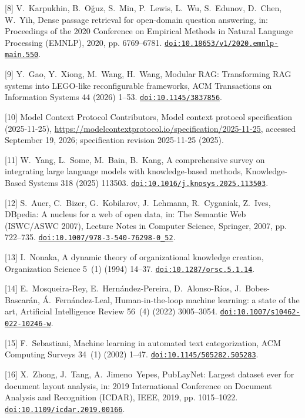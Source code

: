 [8] V.~Karpukhin, B.~O{\u{g}}uz, S.~Min, P.~Lewis, L.~Wu, S.~Edunov, D.~Chen, W.~Yih, Dense passage retrieval for open-domain question answering, in: Proceedings of the 2020 Conference on Empirical Methods in Natural Language Processing ({EMNLP}), 2020, pp. 6769--6781. \href {https://doi.org/10.18653/v1/2020.emnlp-main.550} {\texttt{doi:10.18653/v1/2020.emnlp-main.550}}.

[9] Y.~Gao, Y.~Xiong, M.~Wang, H.~Wang, Modular {RAG}: Transforming {RAG} systems into {LEGO}-like reconfigurable frameworks, ACM Transactions on Information Systems 44 (2026) 1--53. \href {https://doi.org/10.1145/3837856} {\texttt{doi:10.1145/3837856}}.

[10] {Model Context Protocol Contributors}, Model context protocol specification (2025-11-25), \url{https://modelcontextprotocol.io/specification/2025-11-25}, accessed September 19, 2026; specification revision 2025-11-25 (2025).

[11] W.~Yang, L.~Some, M.~Bain, B.~Kang, A comprehensive survey on integrating large language models with knowledge-based methods, Knowledge-Based Systems 318 (2025) 113503. \href {https://doi.org/10.1016/j.knosys.2025.113503} {\texttt{doi:10.1016/j.knosys.2025.113503}}.

[12] S.~Auer, C.~Bizer, G.~Kobilarov, J.~Lehmann, R.~Cyganiak, Z.~Ives, {DBpedia}: A nucleus for a web of open data, in: The Semantic Web (ISWC/ASWC 2007), Lecture Notes in Computer Science, Springer, 2007, pp. 722--735. \href {https://doi.org/10.1007/978-3-540-76298-0_52} {\texttt{doi:10.1007/978-3-540-76298-0\_52}}.

[13] I.~Nonaka, A dynamic theory of organizational knowledge creation, Organization Science 5~(1) (1994) 14--37. \href {https://doi.org/10.1287/orsc.5.1.14} {\texttt{doi:10.1287/orsc.5.1.14}}.

[14] E.~Mosqueira-Rey, E.~Hern{\'a}ndez-Pereira, D.~Alonso-R{\'i}os, J.~Bobes-Bascar{\'a}n, {\'A}.~Fern{\'a}ndez-Leal, Human-in-the-loop machine learning: a state of the art, Artificial Intelligence Review 56~(4) (2022) 3005--3054. \href {https://doi.org/10.1007/s10462-022-10246-w} {\texttt{doi:10.1007/s10462-022-10246-w}}.

[15] F.~Sebastiani, Machine learning in automated text categorization, ACM Computing Surveys 34~(1) (2002) 1--47. \href {https://doi.org/10.1145/505282.505283} {\texttt{doi:10.1145/505282.505283}}.

[16] X.~Zhong, J.~Tang, A.~Jimeno~Yepes, {PubLayNet}: Largest dataset ever for document layout analysis, in: 2019 International Conference on Document Analysis and Recognition (ICDAR), IEEE, 2019, pp. 1015--1022. \href {https://doi.org/10.1109/icdar.2019.00166} {\texttt{doi:10.1109/icdar.2019.00166}}.


